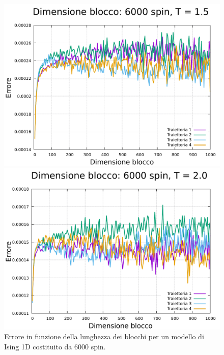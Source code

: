 \begin{figure}[htbp]
    \begin{minipage}{0.45\textwidth}  
      \centering
      \includegraphics[page=1, width=\textwidth]{Immagini/simIsing1D/magn0.0/lblk/err_6000_1.5.pdf}
      \caption{$T\,=\,1.5$}
    \end{minipage}\hfill
    \begin{minipage}{0.45\textwidth}  
      \centering
      \includegraphics[page=1, width=\textwidth]{Immagini/simIsing1D/magn0.0/lblk/err_6000_2.0.pdf}
      \caption{$T\,=\,2.0$}
    \end{minipage}
    \caption{Errore in funzione della lunghezza dei blocchi per un modello di Ising 1D costituito da 6000 spin.}
\end{figure}


